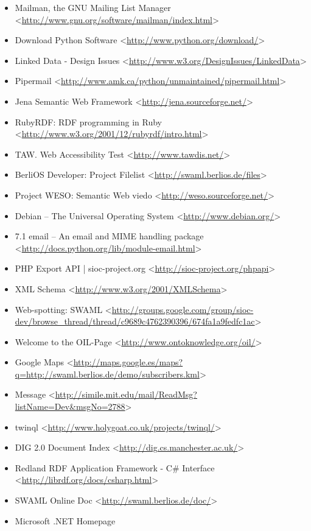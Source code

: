 \begin{itemize}
 \item Mailman, the GNU Mailing List Manager
 <\url{http://www.gnu.org/software/mailman/index.html}>
 \item Download Python Software
 <\url{http://www.python.org/download/}>
 \item Linked Data - Design Issues
 <\url{http://www.w3.org/DesignIssues/LinkedData}>
 \item Pipermail
 <\url{http://www.amk.ca/python/unmaintained/pipermail.html}>
 \item Jena Semantic Web Framework
 <\url{http://jena.sourceforge.net/}>
 \item RubyRDF: RDF programming in Ruby
 <\url{http://www.w3.org/2001/12/rubyrdf/intro.html}>
 \item TAW. Web Accessibility Test
 <\url{http://www.tawdis.net/}>
 \item BerliOS Developer: Project Filelist
 <\url{http://swaml.berlios.de/files}>
 \item Project WESO: Semantic Web viedo
 <\url{http://weso.sourceforge.net/}>
 \item Debian -- The Universal Operating System
 <\url{http://www.debian.org/}>
 \item 7.1 email -- An email and MIME handling package
 <\url{http://docs.python.org/lib/module-email.html}>
 \item PHP Export API | sioc-project.org
 <\url{http://sioc-project.org/phpapi}>
 \item XML Schema
 <\url{http://www.w3.org/2001/XMLSchema}>
 \item Web-spotting: SWAML
 <\url{http://groups.google.com/group/sioc-dev/browse_thread/thread/c9689c4762390396/674fa1a9fedfc1ac}>
 \item Welcome to the OIL-Page
 <\url{http://www.ontoknowledge.org/oil/}>
 \item Google Maps
 <\url{http://maps.google.es/maps?q=http://swaml.berlios.de/demo/subscribers.kml}>
 \item Message
 <\url{http://simile.mit.edu/mail/ReadMsg?listName=Dev&msgNo=2788}>
 \item twinql
 <\url{http://www.holygoat.co.uk/projects/twinql/}>
 \item DIG 2.0 Document Index
 <\url{http://dig.cs.manchester.ac.uk/}>
 \item Redland RDF Application Framework - C\# Interface
 <\url{http://librdf.org/docs/csharp.html}>
 \item SWAML Online Doc
 <\url{http://swaml.berlios.de/doc/}>
 \item Microsoft .NET Homepage

\end{itemize}
